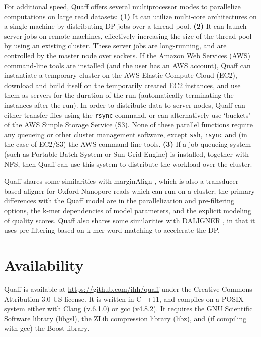 \documentclass{bioinfo}
\begin{document}
\begin{methods}
For additional speed, Quaff offers several multiprocessor modes to parallelize computations on large read datasets: {\bf (1)} It can utilize multi-core architectures on a single machine by distributing DP jobs over a thread pool. {\bf (2)} It can launch server jobs on remote machines, effectively increasing the size of the thread pool by using an existing cluster. These server jobs are long-running, and are controlled by the master node over sockets. If the Amazon Web Services (AWS) command-line tools are installed (and the user has an AWS account), Quaff can instantiate a temporary cluster on the AWS Elastic Compute Cloud (EC2), download and build itself on the temporarily created EC2 instances, and use them as servers for the duration of the run (automatically terminating the instances after the run). In order to distribute data to server nodes, Quaff can either transfer files using the {\tt rsync} command, or can alternatively use `buckets' of the AWS Simple Storage Service (S3). None of these parallel functions require any queueing or other cluster management software, except {\tt ssh}, {\tt rsync} and (in the case of EC2/S3) the AWS command-line tools. {\bf (3)} If a job queueing system (such as Portable Batch System or Sun Grid Engine) is installed, together with NFS, then Quaff can use this system to distribute the workload over the cluster.

Quaff shares some similarities with marginAlign \citep{Jain2015-by}, which is also a transducer-based aligner for Oxford Nanopore reads which can run on a cluster; the primary differences with the Quaff model are in the parallelization and pre-filtering options, the k-mer dependencies of model parameters, and the explicit modeling of quality scores. Quaff also shares some similarities with DALIGNER \citep{Myers2014-em}, in that it uses pre-filtering based on k-mer word matching to accelerate the DP.



\end{methods}





\section{Availability}

Quaff is available at \url{https://github.com/ihh/quaff} under the Creative Commons Attribution 3.0 US license. It is written in C++11, and compiles on a POSIX system either with Clang (v.6.1.0) or gcc (v4.8.2). It requires the GNU Scientific Software library (libgsl), the ZLib compression library (libz), and (if compiling with gcc) the Boost library.
\end{document}
